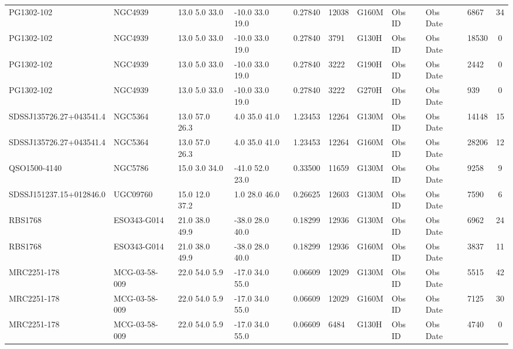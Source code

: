 \documentclass[iop]{emulateapj-rtx4}
\begin{document}
\begin{table}[ht]
\begin{center}
\begin{tabular}{l l l l l l l l l l c}
PG1302-102  &              NGC4939  &       13.0  5.0  33.0  &    -10.0  33.0  19.0  &   0.27840  & 12038  &   G160M  &   Obs ID  & Obs Date  & 6867  &       34          \\
PG1302-102  &              NGC4939  &       13.0  5.0  33.0  &    -10.0  33.0  19.0  &   0.27840  & 3791  &    G130H  &   Obs ID  & Obs Date  & 18530  &      0            \\
PG1302-102  &              NGC4939  &       13.0  5.0  33.0  &    -10.0  33.0  19.0  &   0.27840  & 3222  &    G190H  &   Obs ID  & Obs Date  & 2442  &       0           \\
PG1302-102  &              NGC4939  &       13.0  5.0  33.0  &    -10.0  33.0  19.0  &   0.27840  & 3222  &    G270H  &   Obs ID  & Obs Date  & 939  &        0            \\
SDSSJ135726.27+043541.4  & NGC5364  &       13.0  57.0  26.3  &   4.0  35.0  41.0  &     1.23453  & 12264  &   G130M  &   Obs ID  & Obs Date  & 14148  &      15           \\
SDSSJ135726.27+043541.4  & NGC5364  &       13.0  57.0  26.3  &   4.0  35.0  41.0  &     1.23453  & 12264  &   G160M  &   Obs ID  & Obs Date  & 28206  &      12          \\
QSO1500-4140  &            NGC5786  &       15.0  3.0  34.0  &    -41.0  52.0  23.0  &   0.33500  & 11659  &   G130M  &   Obs ID  & Obs Date  & 9258  &       9           \\
SDSSJ151237.15+012846.0  & UGC09760  &      15.0  12.0  37.2  &   1.0  28.0  46.0  &     0.26625  & 12603  &   G130M  &   Obs ID  & Obs Date  & 7590  &       6           \\
RBS1768  &                 ESO343-G014  &   21.0  38.0  49.9  &   -38.0  28.0  40.0  &   0.18299  & 12936  &   G130M  &   Obs ID  & Obs Date  & 6962  &       24          \\
RBS1768  &                 ESO343-G014  &   21.0  38.0  49.9  &   -38.0  28.0  40.0  &   0.18299  & 12936  &   G160M  &   Obs ID  & Obs Date  & 3837  &       11           \\
MRC2251-178  &             MCG-03-58-009  & 22.0  54.0  5.9  &    -17.0  34.0  55.0  &   0.06609  & 12029  &   G130M  &   Obs ID  & Obs Date  & 5515  &       42           \\
MRC2251-178  &             MCG-03-58-009  & 22.0  54.0  5.9  &    -17.0  34.0  55.0  &   0.06609  & 12029  &   G160M  &   Obs ID  & Obs Date  & 7125  &       30           \\
MRC2251-178  &             MCG-03-58-009  & 22.0  54.0  5.9  &    -17.0  34.0  55.0  &   0.06609  & 6484  &    G130H  &   Obs ID  & Obs Date  & 4740  &       0           \\

\end{tabular}
\end{center}
\end{table}
\end{document}
